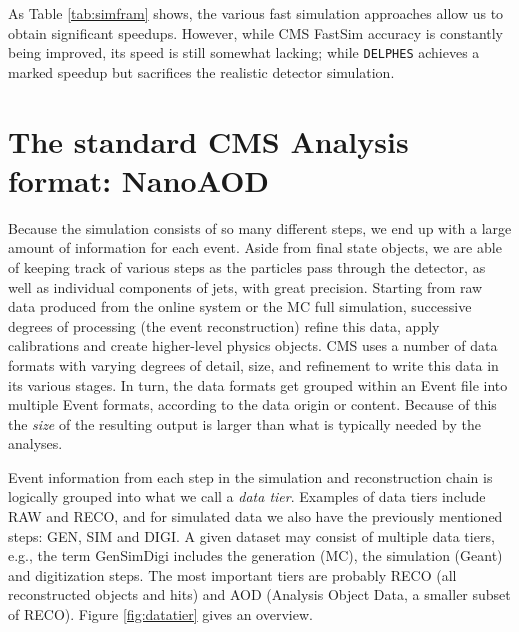 As Table \ref{tab:simfram} shows, the various fast simulation approaches allow us to obtain significant speedups. However, while CMS FastSim accuracy is constantly being improved, its speed is still somewhat lacking; while \texttt{DELPHES} achieves a marked speedup but sacrifices the realistic detector simulation.

\section{The standard CMS Analysis format: NanoAOD}\label{sec:nanoaod}

Because the simulation consists of so many different steps, we end up with a large amount of information for each event. Aside from final state objects, we are able of keeping track of various steps as the particles pass through the detector, as well as individual components of jets, with great precision. Starting from raw data produced from the online system or the MC full simulation, successive degrees of processing (the event reconstruction) refine this data, apply calibrations and create higher-level physics objects. CMS uses a number of data formats with varying degrees of detail, size, and refinement to write this data in its various stages. In turn, the data formats get grouped within an Event file into multiple Event formats, according to the data origin or content. Because of this the \emph{size} of the resulting output is larger than what is typically needed by the analyses.

Event information from each step in the simulation and reconstruction chain is logically grouped into what we call a \emph{data tier}. Examples of data tiers include RAW and RECO, and for simulated data we also have the previously mentioned steps: GEN, SIM and DIGI. A given dataset may consist of multiple data tiers, e.g., the term GenSimDigi includes the generation (MC), the simulation (Geant) and digitization steps. The most important tiers are probably RECO (all reconstructed objects and hits) and AOD (Analysis Object Data, a smaller subset of RECO). Figure \ref{fig:datatier} gives an overview. 

